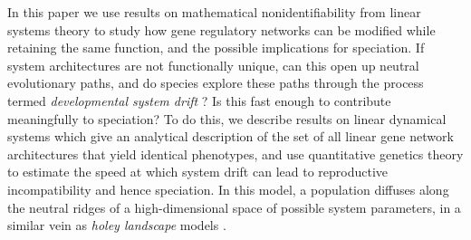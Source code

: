 \documentclass{article}
\newcommand{\1}{\mathbbm{1}}
\begin{document}
In this paper we use results on mathematical nonidentifiability from
linear systems theory to study how gene regulatory networks can be modified
while retaining the same function, and the possible implications for speciation.
If system architectures are not functionally unique,
can this open up neutral evolutionary paths,
and do species explore these paths
through the process termed \emph{developmental system drift} \citep[by][]{true2001developmental}?
Is this fast enough to contribute meaningfully to speciation?
To do this, we describe results on linear dynamical systems which give
an analytical description of the set of 
all linear gene network architectures that yield identical phenotypes,
and use quantitative genetics theory to estimate the speed at which system drift can lead to reproductive incompatibility and hence speciation.
In this model,
a population diffuses along the neutral ridges of a high-dimensional space of possible system parameters,
in a similar vein as \emph{holey landscape} models \citep{gavrilets1997evolution, yamaguchi2013first, pina2019does}.  
\end{document}
